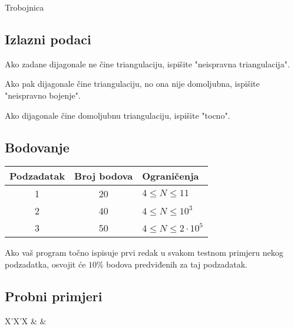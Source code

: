 \begin{statement}[
  problempoints=110,
  timelimit=2 sekunde,
  memorylimit=512 MiB,
]{Trobojnica}
\subsection*{Izlazni podaci}
Ako zadane dijagonale ne čine triangulaciju, ispišite "neispravna triangulacija".

Ako pak dijagonale čine triangulaciju, no ona nije domoljubna, ispišite "neispravno bojenje".

Ako dijagonale čine domoljubnu triangulaciju, ispišite "tocno".

\subsection*{Bodovanje}
{\renewcommand{\arraystretch}{1.4}
  \setlength{\tabcolsep}{6pt}
  \begin{tabular}{ccl}
 Podzadatak & Broj bodova & Ograničenja \\ \midrule
  1 & 20 & $4 \le N \le 11$ \\
  2 & 40 & $4 \le N \le 10^3$ \\
  3 & 50 & $4 \le N \le 2\cdot10^5$ \\
\end{tabular}}

Ako vaš program točno ispisuje prvi redak u svakom testnom primjeru nekog
podzadatka, osvojit će $10\%$ bodova predviđenih za taj podzadatak.

\subsection*{Probni primjeri}
\begin{tabularx}{\textwidth}{X'X'X}
 &
 &
\end{tabularx}




\end{statement}

